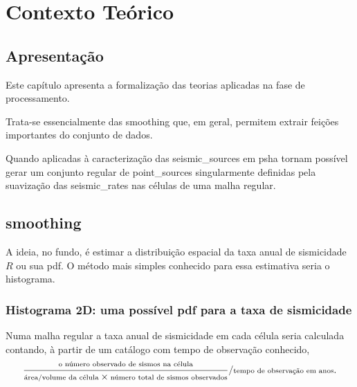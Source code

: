 \chapter{Contexto Teórico}
\label{cap:teoria}


\section{Apresentação}
\label{sec:c04_apresentacao}

Este capítulo apresenta a formalização das teorias aplicadas na fase de
processamento. 

Trata-se essencialmente das \gls{smoothing} que, em geral, permitem extrair 
feições importantes do conjunto de dados.

Quando aplicadas à caracterização das \glspl{seismic_source} em \gls{psha}
tornam possível gerar um conjunto regular de \glspl{point_source} 
singularmente definidas pela suavização das \glspl{seismic_rate} 
nas células de uma malha regular.


\section{\Gls{smoothing}}
\label{sec:04_smoothing_general}

A ideia, no fundo, é estimar a distribuição espacial da taxa anual de sismicidade $R$
ou sua \gls{pdf}.
O método mais simples conhecido para essa estimativa seria o histograma.

\subsection{Histograma 2D: uma possível \glsdesc{pdf} para a taxa de sismicidade}

Numa malha regular a taxa anual de sismicidade em cada célula seria calculada 
contando, à partir de um catálogo com tempo de observação conhecido,
\begin{equation}
\scriptsize
	\ensuremath{
	\frac{\text{o número observado de sismos na célula}}
		 {\text{área/volume da célula} \times 
		  \text{número total de sismos observados}}
	/
	\text{tempo de observação em anos}
	}
\normalsize.
\label{eq:rate_count}
\end{equation}

